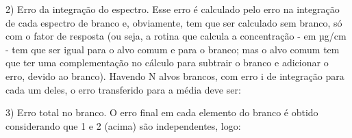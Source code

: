 
2) Erro da integração do espectro. Esse erro é calculado pelo erro na integração de cada espectro de branco e, obviamente, tem que ser calculado sem branco, só com o fator de resposta (ou seja, a rotina que calcula a concentração - em µg/cm - tem que ser igual para o alvo comum e para o branco; mas o alvo comum tem que ter uma complementação no cálculo para subtrair o branco e adicionar o erro, devido ao branco). Havendo N alvos brancos, com erro  i de integração para cada um deles, o erro transferido para a média deve ser:


3) Erro total no branco. O erro final em cada elemento do branco é obtido considerando que 1 e 2 (acima) são independentes, logo:





